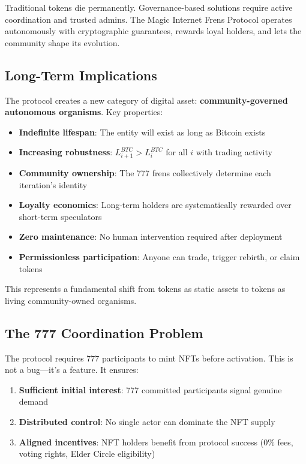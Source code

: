 \documentclass[11pt,a4paper]{article}
\begin{document}
Traditional tokens die permanently. Governance-based solutions require active coordination and trusted admins. The Magic Internet Frens Protocol operates autonomously with cryptographic guarantees, rewards loyal holders, and lets the community shape its evolution.

\subsection{Long-Term Implications}

The protocol creates a new category of digital asset: \textbf{community-governed autonomous organisms}. Key properties:

\begin{itemize}
    \item \textbf{Indefinite lifespan}: The entity will exist as long as Bitcoin exists
    \item \textbf{Increasing robustness}: $L_{i+1}^{BTC} > L_i^{BTC}$ for all $i$ with trading activity
    \item \textbf{Community ownership}: The 777 frens collectively determine each iteration's identity
    \item \textbf{Loyalty economics}: Long-term holders are systematically rewarded over short-term speculators
    \item \textbf{Zero maintenance}: No human intervention required after deployment
    \item \textbf{Permissionless participation}: Anyone can trade, trigger rebirth, or claim tokens
\end{itemize}

This represents a fundamental shift from tokens as static assets to tokens as living community-owned organisms.

\subsection{The 777 Coordination Problem}

The protocol requires 777 participants to mint NFTs before activation. This is not a bug---it's a feature. It ensures:

\begin{enumerate}
    \item \textbf{Sufficient initial interest}: 777 committed participants signal genuine demand
    \item \textbf{Distributed control}: No single actor can dominate the NFT supply
    \item \textbf{Aligned incentives}: NFT holders benefit from protocol success (0\% fees, voting rights, Elder Circle eligibility)
\end{enumerate}
\end{document}
